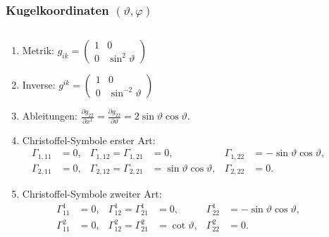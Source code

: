 %
%
%
\bgroup
\begin{frame}[t]
\setlength{\abovedisplayskip}{5pt}
\setlength{\belowdisplayskip}{5pt}
\frametitle{Kugelkoordinaten $(\vartheta,\varphi)$}
\vspace{-20pt}
\begin{columns}[t,onlytextwidth]
\begin{column}{0.58\textwidth}
\begin{enumerate}
\item<2->
Metrik: $\displaystyle
g_{ik}
=
\begin{pmatrix}
1&0\\
0&\sin^2\vartheta
\end{pmatrix}
$
\item<3->
Inverse: $\displaystyle
g^{ik}
=
\begin{pmatrix}
1&0\\
0&\sin^{-2}\vartheta
\end{pmatrix}
$
\item<4->
Ableitungen: $\displaystyle
\frac{\partial g_{22}}{\partial x^1}
=
\frac{\partial g_{22}}{\partial\vartheta}
=
2\sin\vartheta\cos\vartheta.
$
\item<5->
Christoffel-Symbole erster Art:
\[
\begin{aligned}
\Gamma_{1,11}
&=
0,
&
\Gamma_{1,12} = \Gamma_{1,21}
&=
0,
&
\Gamma_{1,22}
&=
-\sin\vartheta\cos\vartheta,
\\
\Gamma_{2,11}
&=
0,
&
\Gamma_{2,12} = \Gamma_{2,21}
&=
\sin\vartheta\cos\vartheta,
&
\Gamma_{2,22}
&=
0.
\end{aligned}
\]
\item<6->
Christoffel-Symbole zweiter Art:
\[
\begin{aligned}
\Gamma^1_{11}
&=
0,
&
\Gamma^1_{12}
=
\Gamma^1_{21}
&=
0,
&
\Gamma^1_{22}
&=
-\sin\vartheta\cos\vartheta,
\\
\Gamma^2_{11}
&=
0,
&
\Gamma^2_{12}
=
\Gamma^2_{21}
&=
\cot\vartheta,
&
\Gamma^2_{22}
&=
0.
\end{aligned}
\]

\end{enumerate}
\end{column}
\begin{column}{0.38\textwidth}
\end{column}
\end{columns}
\end{frame}
\egroup
